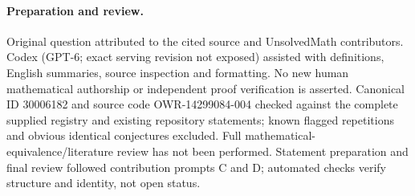 \documentclass[11pt]{article}
\begin{document}
\paragraph{Preparation and review.}
Original question attributed to the cited source and UnsolvedMath contributors. Codex (GPT-6; exact serving revision not exposed) assisted with definitions, English summaries, source inspection and formatting. No new human mathematical authorship or independent proof verification is asserted. Canonical ID 30006182 and source code OWR-14299084-004 checked against the complete supplied registry and existing repository statements; known flagged repetitions and obvious identical conjectures excluded. Full mathematical-equivalence/literature review has not been performed. Statement preparation and final review followed contribution prompts C and D; automated checks verify structure and identity, not open status.
\label{end:30006182}
\end{document}
